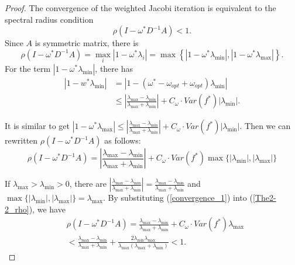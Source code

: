 \documentclass[preprint,review,sort&compress,3p]{elsarticle}
\begin{document}
\begin{proof}
	The convergence of the weighted Jacobi iteration is equivalent to the spectral radius condition
	\begin{equation}
		\label{convergence_eq1}
		\rho(I-\omega^* D^{-1}A)  <1.
	\end{equation}
	Since $A$ is symmetric matrix, there is
	$$\rho(I-\omega^* D^{-1}A) = \max\limits_{i}\left\vert 1-\omega^* \lambda_i  \right\vert = \max\left\{ \left\vert 1-\omega^*\lambda_{\min} \right\vert, \left\vert 1-\omega^*\lambda_{\max} \right\vert \right\}. $$
	For the term $\left\vert 1-\omega^*\lambda_{\min} \right\vert$, there has
	\begin{align*}
		\left\vert 1-w^*\lambda_{\min}  \right\vert & = \left\vert 1-(\omega^*-\omega_{opt}+\omega_{opt})\lambda_{\min} \right\vert \\
		& \le \left\vert \frac{\lambda_{\max}-\lambda_{\min}}{\lambda_{\max}+\lambda_{\min}}\right\vert + C_\omega \cdot Var(f^*)\left\vert \lambda_{\min} \right\vert. 
	\end{align*}
	
	It is similar to get $\left\vert 1-\omega^*\lambda_{\max}  \right\vert \le \left\vert \frac{\lambda_{\max}-\lambda_{\min}}{\lambda_{\max}+\lambda_{\min}} \right\vert + C_\omega \cdot Var(f^*)\left\vert \lambda_{\min} \right\vert$. Then we can rewritten $\rho(I-\omega^* D^{-1} A)$ as follows:
	\begin{equation}
		\label{The2-2_rho}
		\rho(I-\omega^* D^{-1} A) = \left\vert \frac{\lambda_{\max}-\lambda_{\min}}{\lambda_{\max}+\lambda_{\min}}\right\vert+C_\omega \cdot Var(f^*) \max\{\vert \lambda_{\min}\vert, \vert \lambda_{\max}\vert\}
	\end{equation} 
	
	If $\lambda_{\max}>\lambda_{\min}>0$, there are $\left\vert \frac{\lambda_{\max}-\lambda_{\min}}{\lambda_{\max}+\lambda_{\min}} \right\vert = \frac{\lambda_{\max}-\lambda_{\min}}{\lambda_{\max}+\lambda_{\min}}$ and $\max\{\vert \lambda_{\min}\vert, \vert \lambda_{\max}\vert\} = \lambda_{\max} $. By substituting (\ref{convergence_1}) into (\ref{The2-2_rho}), we have
	\begin{align*}
		&\rho(I-\omega^* D^{-1} A)  = \frac{\lambda_{\max}-\lambda_{\min}}{\lambda_{\max}+\lambda_{\min}}+C_\omega \cdot Var(f^*) \lambda_{\max}\\
		&<\frac{\lambda_{\max}-\lambda_{\min}}{\lambda_{\max}+\lambda_{\min}}+\frac{2\lambda_{\min}\lambda_{\max}}{\lambda_{\max}(\lambda_{\max}+\lambda_{\min})}<1.
	\end{align*}
	

\end{proof}
\end{document}
